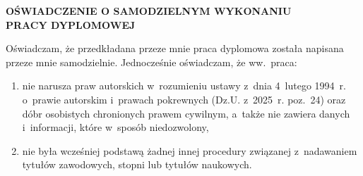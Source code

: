 \thispagestyle{empty}
\begingroup
\small{}

\begin{center}
  {\large\bfseries OŚWIADCZENIE O SAMODZIELNYM WYKONANIU\\ PRACY DYPLOMOWEJ}
\end{center}
\vspace{4pt}

Oświadczam, że przedkładana przeze mnie praca dyplomowa 
została napisana przeze mnie samodzielnie. Jednocześnie oświadczam, że
ww.~praca:
\begin{enumerate}
  \item nie narusza praw autorskich w~rozumieniu ustawy z~dnia 4~lutego 1994~r.
    o~prawie autorskim i~prawach pokrewnych (Dz.U. z~2025~r. poz.~24) oraz
    dóbr osobistych chronionych prawem cywilnym, a~także nie zawiera danych
    i~informacji, które 
    w~sposób niedozwolony,
  \item nie była wcześniej podstawą żadnej innej procedury związanej
    z~nadawaniem tytułów zawodowych, stopni lub tytułów naukowych.
\end{enumerate}


